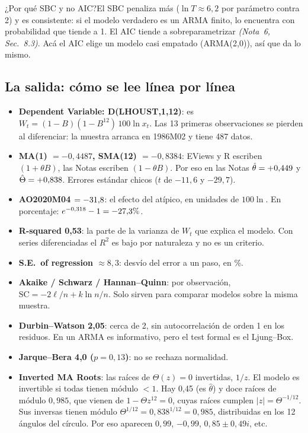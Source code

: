 \documentclass[11pt,a4paper]{article}
\newcommand{\nota}[2]{\textit{(Nota~#1, Sec.~#2)}}
\newcommand{\Q}[2]{\begin{pregunta}{#1}#2\end{pregunta}}
\begin{document}
\Q{¿Por qu\'e SBC y no AIC?}{El SBC penaliza m\'as ($\ln T\approx6{,}2$ por par\'ametro contra 2) y es consistente: si el modelo verdadero es un ARMA finito, lo encuentra con probabilidad que tiende a 1. El AIC tiende a sobreparametrizar \nota{6}{8.3}. Ac\'a el AIC elige un modelo casi empatado (ARMA(2,0)), as\'i que da lo mismo.}

\subsection{La salida: c\'omo se lee l\'inea por l\'inea}
\begin{itemize}
\item \textbf{Dependent Variable: D(LHOUST,1,12)}: es $W_t=(1-B)(1-B^{12})\,100\ln x_t$. Las 13 primeras observaciones se pierden al diferenciar: la muestra arranca en 1986M02 y tiene 487 datos.
\item \textbf{MA(1) $=-0{,}4487$, SMA(12) $=-0{,}8384$}: EViews y R escriben $(1+\theta B)$, las Notas escriben $(1-\theta B)$. Por eso en las Notas $\hat\theta=+0{,}449$ y $\hat\Theta=+0{,}838$. Errores est\'andar chicos ($t$ de $-11{,}6$ y $-29{,}7$).
\item \textbf{AO2020M04 $=-31{,}8$}: el efecto del at\'ipico, en unidades de $100\ln$. En porcentaje: $e^{-0{,}318}-1=-27{,}3\%$.
\item \textbf{R-squared 0,53}: la parte de la varianza de $W_t$ que explica el modelo. Con series diferenciadas el $R^2$ es bajo por naturaleza y no es un criterio.
\item \textbf{S.E.\ of regression $\approx8{,}3$}: desv\'io del error a un paso, en \%.
\item \textbf{Akaike / Schwarz / Hannan--Quinn}: por observaci\'on, $\text{SC}=-2\ell/n+k\ln n/n$. Solo sirven para comparar modelos sobre la misma muestra.
\item \textbf{Durbin--Watson 2,05}: cerca de 2, sin autocorrelaci\'on de orden 1 en los residuos. En un ARMA es informativo, pero el test formal es el Ljung--Box.
\item \textbf{Jarque--Bera 4,0 ($p=0{,}13$)}: no se rechaza normalidad.
\item \textbf{Inverted MA Roots}: las ra\'ices de $\Theta(z)=0$ invertidas, $1/z$. El modelo es invertible si todas tienen m\'odulo $<1$. Hay 0,45 (es $\hat\theta$) y doce ra\'ices de m\'odulo $0{,}985$, que vienen de $1-\Theta z^{12}=0$, cuyas ra\'ices cumplen $|z|=\Theta^{-1/12}$. Sus inversas tienen m\'odulo $\Theta^{1/12}=0{,}838^{1/12}=0{,}985$, distribuidas en los 12 \'angulos del c\'irculo. Por eso aparecen $0{,}99$, $-0{,}99$, $0{,}85\pm0{,}49i$, etc.
\end{itemize}
\end{document}
